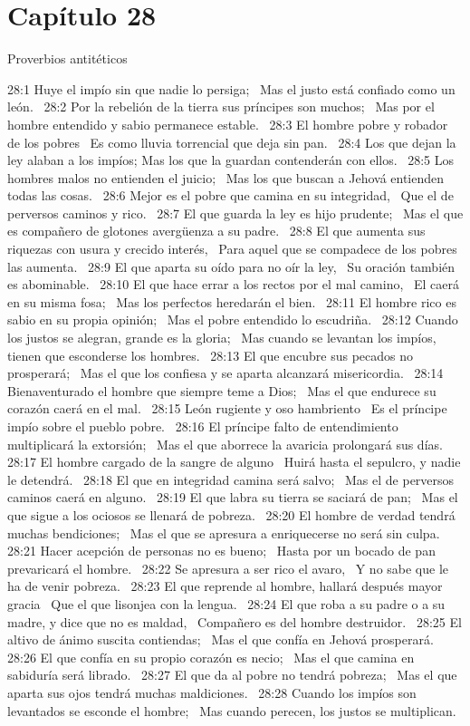 \section*{Capítulo 28 }
Proverbios antitéticos  

28:1 Huye el impío sin que nadie lo persiga;  
Mas el justo está confiado como un león.  
28:2 Por la rebelión de la tierra sus príncipes son muchos;  
Mas por el hombre entendido y sabio permanece estable.  
28:3 El hombre pobre y robador de los pobres  
Es como lluvia torrencial que deja sin pan.  
28:4 Los que dejan la ley alaban a los impíos; 
Mas los que la guardan contenderán con ellos.  
28:5 Los hombres malos no entienden el juicio;  
Mas los que buscan a Jehová entienden todas las cosas.  
28:6 Mejor es el pobre que camina en su integridad,  
Que el de perversos caminos y rico.  
28:7 El que guarda la ley es hijo prudente;  
Mas el que es compañero de glotones avergüenza a su padre.  
28:8 El que aumenta sus riquezas con usura y crecido interés,  
Para aquel que se compadece de los pobres las aumenta.  
28:9 El que aparta su oído para no oír la ley,  
Su oración también es abominable.  
28:10 El que hace errar a los rectos por el mal camino,  
El caerá en su misma fosa;  
Mas los perfectos heredarán el bien.  
28:11 El hombre rico es sabio en su propia opinión;  
Mas el pobre entendido lo escudriña.  
28:12 Cuando los justos se alegran, grande es la gloria;  
Mas cuando se levantan los impíos, tienen que esconderse los hombres.  
28:13 El que encubre sus pecados no prosperará;  
Mas el que los confiesa y se aparta alcanzará misericordia.  
28:14 Bienaventurado el hombre que siempre teme a Dios;  
Mas el que endurece su corazón caerá en el mal.  
28:15 León rugiente y oso hambriento  
Es el príncipe impío sobre el pueblo pobre.  
28:16 El príncipe falto de entendimiento multiplicará la extorsión;  
Mas el que aborrece la avaricia prolongará sus días.  
28:17 El hombre cargado de la sangre de alguno  
Huirá hasta el sepulcro, y nadie le detendrá.  
28:18 El que en integridad camina será salvo;  
Mas el de perversos caminos caerá en alguno.  
28:19 El que labra su tierra se saciará de pan;  
Mas el que sigue a los ociosos se llenará de pobreza.  
28:20 El hombre de verdad tendrá muchas bendiciones;  
Mas el que se apresura a enriquecerse no será sin culpa.  
28:21 Hacer acepción de personas no es bueno;  
Hasta por un bocado de pan prevaricará el hombre.  
28:22 Se apresura a ser rico el avaro,  
Y no sabe que le ha de venir pobreza.  
28:23 El que reprende al hombre, hallará después mayor gracia  
Que el que lisonjea con la lengua.  
28:24 El que roba a su padre o a su madre, y dice que no es maldad,  
Compañero es del hombre destruidor.  
28:25 El altivo de ánimo suscita contiendas;  
Mas el que confía en Jehová prosperará.  
28:26 El que confía en su propio corazón es necio;  
Mas el que camina en sabiduría será librado.  
28:27 El que da al pobre no tendrá pobreza;  
Mas el que aparta sus ojos tendrá muchas maldiciones.  
28:28 Cuando los impíos son levantados se esconde el hombre;  
Mas cuando perecen, los justos se multiplican. 
